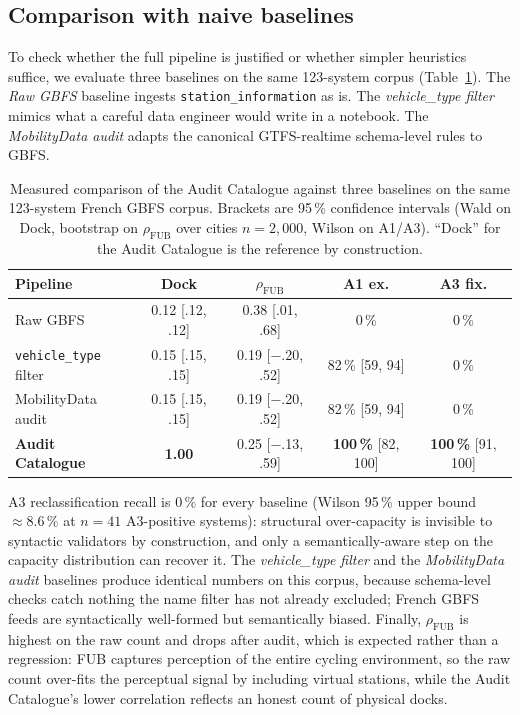 \documentclass[11pt,a4paper]{article}
\begin{document}
\subsection{Comparison with naive baselines}
To check whether the full pipeline is justified or whether simpler
heuristics suffice, we evaluate three baselines on the
same 123-system corpus
(Table~\ref{tab:baselines}). The \emph{Raw GBFS} baseline ingests
\texttt{station\_information} as is. The \emph{vehicle\_type filter}
mimics what a careful data engineer would write in a notebook. The
\emph{MobilityData audit} adapts the canonical GTFS-realtime
schema-level rules to GBFS.

\begin{table}[!htbp]
\centering
\caption{Measured comparison of the Audit Catalogue against three
baselines on the same 123-system French GBFS corpus. Brackets are
95\,\% confidence intervals (Wald on Dock, bootstrap on
$\rho_{\text{FUB}}$ over cities $n=2{,}000$, Wilson on A1/A3). ``Dock''
for the Audit Catalogue is the reference by construction.}
\label{tab:baselines}
\small
\begin{tabular}{@{}lcccc@{}}
\toprule
\textbf{Pipeline} & \textbf{Dock} & \textbf{$\rho_{\text{FUB}}$} &
\textbf{A1 ex.} & \textbf{A3 fix.}\\
\midrule
Raw GBFS &
  0.12 \footnotesize[.12, .12] &
  0.38 \footnotesize[.01, .68] &
  0\,\% & 0\,\% \\
\texttt{vehicle\_type} filter &
  0.15 \footnotesize[.15, .15] &
  0.19 \footnotesize[$-$.20, .52] &
  82\,\% \footnotesize[59, 94] & 0\,\% \\
MobilityData audit &
  0.15 \footnotesize[.15, .15] &
  0.19 \footnotesize[$-$.20, .52] &
  82\,\% \footnotesize[59, 94] & 0\,\% \\
\textbf{Audit Catalogue} &
  \textbf{1.00} &
  0.25 \footnotesize[$-$.13, .59] &
  \textbf{100\,\%} \footnotesize[82, 100] &
  \textbf{100\,\%} \footnotesize[91, 100] \\
\bottomrule
\end{tabular}
\end{table}

A3 reclassification recall is $0\,\%$ for every baseline
(Wilson 95\,\% upper bound $\approx 8.6\,\%$ at $n = 41$ A3-positive
systems): structural over-capacity is invisible to syntactic validators by
construction, and only a semantically-aware step on the capacity
distribution can recover it. The \emph{vehicle\_type filter} and the
\emph{MobilityData audit} baselines produce identical numbers on this
corpus, because schema-level checks catch nothing the name filter has not
already excluded; French GBFS feeds are syntactically well-formed but
semantically biased. Finally, $\rho_{\text{FUB}}$ is highest on the raw
count and drops after audit, which is expected rather than a regression:
FUB captures perception of the entire cycling environment, so the raw
count over-fits the perceptual signal by including virtual stations, while
the Audit Catalogue's lower correlation reflects an honest count of
physical docks.
\end{document}
